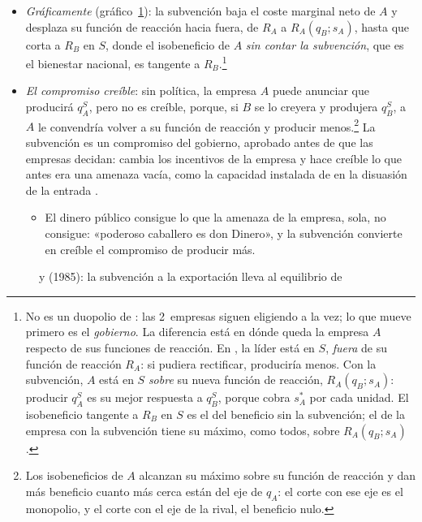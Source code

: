 \documentclass[11pt]{article}
\begin{document}
\begin{itemize}
\item \emph{Gráficamente} (gráfico~\ref{fig:brander-spencer}): la subvención baja el coste marginal neto de $A$ y desplaza su función de reacción hacia fuera, de $R_A$ a $R_A(q_B;s_A)$, hasta que corta a $R_B$ en $S$, donde el isobeneficio de $A$ \emph{sin contar la subvención}, que es el bienestar nacional, es tangente a $R_B$.\footnote{No es un duopolio de : las 2~empresas siguen eligiendo a la vez; lo que mueve primero es el \emph{gobierno}. La diferencia está en dónde queda la empresa $A$ respecto de sus funciones de reacción. En , la líder está en $S$, \emph{fuera} de su función de reacción $R_A$: si pudiera rectificar, produciría menos. Con la subvención, $A$ está en $S$ \emph{sobre} su nueva función de reacción, $R_A(q_B;s_A)$: producir $q_A^S$ es su mejor respuesta a $q_B^S$, porque cobra $s_A^*$ por cada unidad. El isobeneficio tangente a $R_B$ en $S$ es el del beneficio sin la subvención; el de la empresa con la subvención tiene su máximo, como todos, sobre $R_A(q_B;s_A)$.}
\item \emph{El compromiso creíble}: sin política, la empresa $A$ puede anunciar que producirá $q_A^S$, pero no es creíble, porque, si $B$ se lo creyera y produjera $q_B^S$, a $A$ le convendría volver a su función de reacción y producir menos.\footnote{Los isobeneficios de $A$ alcanzan su máximo sobre su función de reacción y dan más beneficio cuanto más cerca están del eje de $q_A$: el corte con ese eje es el monopolio, y el corte con el eje de la rival, el beneficio nulo.} La subvención es un compromiso del gobierno, aprobado antes de que las empresas decidan: cambia los incentivos de la empresa y hace creíble lo que antes era una amenaza vacía, como la capacidad instalada de \textcite{Dixit1980Role} en la disuasión de la entrada .
  \begin{itemize}
  \item El dinero público consigue lo que la amenaza de la empresa, sola, no consigue: «poderoso caballero es don Dinero», y la subvención convierte en creíble el compromiso de producir más.
  \end{itemize}
\end{itemize}

\begin{figure}[H]
\centering
\caption{ y  (1985): la subvención a la exportación lleva al equilibrio de }\label{fig:brander-spencer}
\end{figure}
\end{document}
